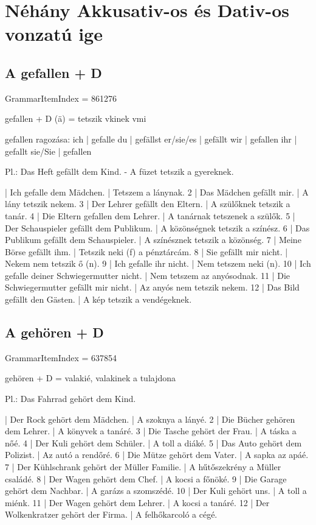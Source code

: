 \documentclass{article}
\newenvironment{desc}{\verbatim}{\endverbatim}
\newenvironment{exmp}{\verbatim}{\endverbatim}
\begin{document}
\section{Néhány Akkusativ-os és Dativ-os vonzatú ige}

\subsection{A gefallen + D}

GrammarItemIndex = 861276

\begin{desc}
gefallen + D (ä) = tetszik vkinek vmi

gefallen ragozása:
ich       | gefalle
du        | gefällst
er/sie/es | gefällt
wir       | gefallen
ihr       | gefallt
sie/Sie   | gefallen

Pl.: Das Heft gefällt dem Kind. - A füzet tetszik a gyereknek.
\end{desc}

\begin{exmp}
1 | Ich gefalle dem Mädchen. | Tetszem a lánynak.
2 | Das Mädchen gefällt mir. | A lány tetszik nekem.
3 | Der Lehrer gefällt den Eltern. | A szülőknek tetszik a tanár.
4 | Die Eltern gefallen dem Lehrer. | A tanárnak tetszenek a szülők.
5 | Der Schauspieler gefällt dem Publikum. | A közönségnek tetszik a színész.
6 | Das Publikum gefällt dem Schauspieler. | A színésznek tetszik a közönség.
7 | Meine Börse gefällt ihm. | Tetszik neki (f) a pénztárcám.
8 | Sie gefällt mir nicht. | Nekem nem tetszik ő (n).
9 | Ich gefalle ihr nicht. | Nem tetszem neki (n).
10 | Ich gefalle deiner Schwiegermutter nicht. | Nem tetszem az anyósodnak.
11 | Die Schwiegermutter gefällt mir nicht. | Az anyós nem tetszik nekem.
12 | Das Bild gefällt den Gästen. | A kép tetszik a vendégeknek.
\end{exmp}

\subsection{A gehören + D}

GrammarItemIndex = 637854

\begin{desc}
gehören + D = valakié, valakinek a tulajdona

Pl.: Das Fahrrad gehört dem Kind.
\end{desc}

\begin{exmp}
1 | Der Rock gehört dem Mädchen. | A szoknya a lányé.
2 | Die Bücher gehören dem Lehrer. | A könyvek a tanáré.
3 | Die Tasche gehört der Frau. | A táska a nőé.
4 | Der Kuli gehört dem Schüler. | A toll a diáké.
5 | Das Auto gehört dem Polizist. | Az autó a rendőré.
6 | Die Mütze gehört dem Vater. | A sapka az apáé.
7 | Der Kühlschrank gehört der Müller Familie. | A hűtőszekrény a Müller családé.
8 | Der Wagen gehört dem Chef. | A kocsi a főnöké.
9 | Die Garage gehört dem Nachbar. | A garázs a szomszédé.
10 | Der Kuli gehört uns. | A toll a miénk.
11 | Der Wagen gehört dem Lehrer. | A kocsi a tanáré.
12 | Der Wolkenkratzer gehört der Firma. | A felhőkarcoló a cégé.
\end{exmp}
\end{document}
